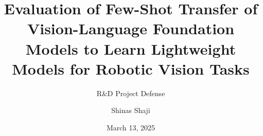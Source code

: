 


\author[Shinas Shaji]{Shinas Shaji}
\title{Evaluation of Few-Shot Transfer of Vision-Language Foundation Models to Learn Lightweight Models for Robotic Vision Tasks}
\subtitle{R\&D Project Defense}
\date{March 13, 2025}
\subject{R\&D Project Defense}

\def\advisors{Prof. Dr. Sebastian Houben (Hochschule Bonn-Rhein-Sieg, Fraunhofer IAIS) \\
Santosh Thoduka M.Sc. (Fraunhofer IAIS)}



{
\begin{frame}
\titlepage
\end{frame}
}








